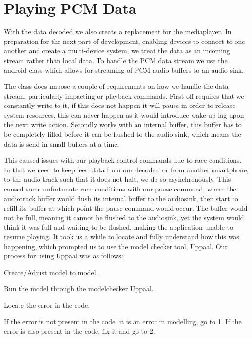 \section{Playing \ac{PCM} Data}
With the data decoded we also create a replacement for the mediaplayer.
In preparation for the next part of development, enabling devices to connect to one another and create a multi-device system, we treat the data as an incoming stream rather than local data.
To handle the \ac{PCM} data stream we use the android class  which allows for streaming of PCM audio buffers to an audio sink.

The  class does impose a couple of requirements on how we handle the data stream, particularly impacting or playback commands.
First off  requires that we constantly write to it, if this does not happen it will pause in order to release system resources, this can never happen as it would introduce wake up lag upon the next write action.
Secondly  works with an internal buffer, this buffer has to be completely filled before it can be flushed to the audio sink, which means the data is send in small buffers at a time.\cite{audiotrack}

This caused issues with our playback control commands due to race conditions.
In that we need to keep feed data from our decoder, or from another smartphone, to the audio track such that it does not halt, we do so asynchronously.
This caused some unfortunate race conditions with our pause command, where the audiotrack buffer would flush its internal buffer to the audiosink, then start to refill its buffer at which point the pause command would occur.
The buffer would not be full, meaning it cannot be flushed to the audiosink, yet the system would think it was full and waiting to be flushed, making the application unable to resume playing.
It took us a while to locate and fully understand how this was happening, which prompted us to use the model checker tool, Uppaal.
Our process for using Uppaal was as follows:
\begin{enumberate}
    \item Create/Adjust model to model .
    \item Run the model through the modelchecker Uppaal.
    \item Locate the error in the code.
    \item If the error is not present in the code, it is an error in modelling, go to 1. If the error is also present in the code, fix it and go to 2.
\end{enumberate}


